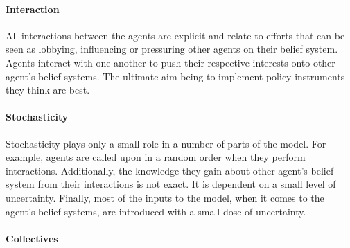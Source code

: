 \paragraph{Interaction}

All interactions between the agents are explicit and relate to efforts that can be seen as lobbying, influencing or pressuring other agents on their belief system. Agents interact with one another to push their respective interests onto other agent's belief systems. The ultimate aim being to implement policy instruments they think are best.

\paragraph{Stochasticity}

Stochasticity plays only a small role in a number of parts of the model. For example, agents are called upon in a random order when they perform interactions. Additionally, the knowledge they gain about other agent's belief system from their interactions is not exact. It is dependent on a small level of uncertainty. Finally, most of the inputs to the model, when it comes to the agent's belief systems, are introduced with a small dose of uncertainty.

\paragraph{Collectives}


